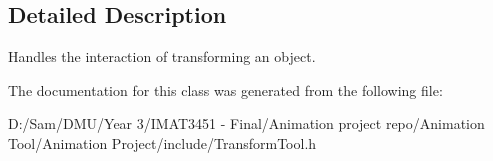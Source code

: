 \subsection{Detailed Description}
Handles the interaction of transforming an object. 

The documentation for this class was generated from the following file\+:\begin{DoxyCompactItemize}
\item 
D\+:/\+Sam/\+D\+M\+U/\+Year 3/\+I\+M\+A\+T3451 -\/ Final/\+Animation project repo/\+Animation Tool/\+Animation Project/include/Transform\+Tool.\+h\end{DoxyCompactItemize}
